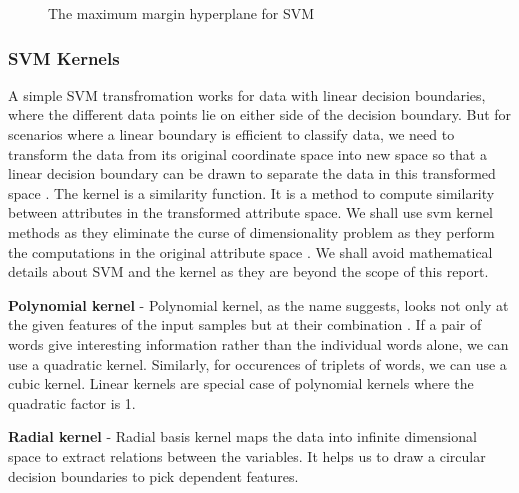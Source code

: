 \documentclass[9pt,twocolumn,twoside]{../../styles/osajnl}
\begin{document}
\begin{figure}[htbp]
\centering
{}
\caption{The maximum margin hyperplane for SVM \cite{www-svm-tutorial}}
\label{fig:The maximum margin hyperplane for SVM}
\end{figure}

\subsubsection{SVM Kernels}
A simple SVM transfromation works for data with linear decision
boundaries, where the different data points lie on either side of the
decision boundary. But for scenarios where a linear boundary is
efficient to classify data, we need to transform the data from its
original coordinate space into new space so that a linear decision
boundary can be drawn to separate the data in this transformed space
\cite{book-dataminingintroduction}. The kernel is a similarity
function. It is a method to compute similarity between attributes in
the transformed attribute space. We shall use svm kernel methods as
they eliminate the curse of dimensionality problem as they perform the
computations in the original attribute space
\cite{book-dataminingintroduction}. We shall avoid mathematical
details about SVM and the kernel as they are beyond the scope of this
report.

\textbf{Polynomial kernel} - Polynomial kernel, as the name suggests, looks not
only at the given features of the input samples but at their
combination \cite{www-polykernel-wiki}. If a pair of words give
interesting information rather than the individual words alone, we can
use a quadratic kernel. Similarly, for occurences of triplets of
words, we can use a cubic kernel. Linear kernels are special case of
polynomial kernels where the quadratic factor is 1.


\textbf{Radial kernel} - Radial basis kernel maps the data into infinite
dimensional space to extract relations between the variables. It helps
us to draw a circular decision boundaries to pick dependent features.
\end{document}
